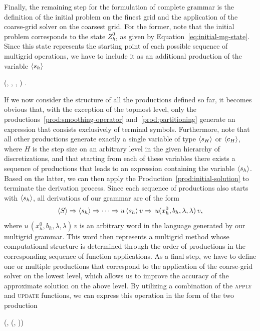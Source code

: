 Finally, the remaining step for the formulation of complete grammar is the definition of the initial problem on the finest grid and the application of the coarse-grid solver on the coarsest grid.
For the former, note that the initial problem corresponds to the state $Z_h^0$, as given by Equation~\eqref{eq:initial-mg-state}.
Since this state represents the starting point of each possible sequence of multigrid operations, we have to include it as an additional production of the variable $\langle s_h \rangle$
\begin{production}
	 {
	 (, , \bnfes, \bnfes)
	}.
\label{prod:initial-solution}
\end{production} 
If we now consider the structure of all the productions defined so far, it becomes obvious that, with the exception of the topmost level, only the productions~\eqref{prod:smoothing-operator} and~\eqref{prod:partitioning} generate an expression that consists exclusively of terminal symbols.
Furthermore, note that all other productions generate exactly a single variable of type $\langle s_H \rangle$ or $\langle c_H \rangle$, where $H$ is the step size on an arbitrary level in the given hierarchy of discretizations, and that starting from each of these variables there exists a sequence of productions that leads to an expression containing the variable $\langle s_h \rangle$.
Based on the latter, we can then apply the Production~\eqref{prod:initial-solution} to terminate the derivation process.
Since each sequence of productions also starts with $\langle s_h \rangle$, all derivations of our grammar are of the form
\begin{equation*}
	\langle S \rangle \Rightarrow \langle s_h \rangle \Rightarrow \dots \Rightarrow u \, \langle s_h \rangle \, v \Rightarrow \, u (x_h^0, b_h, \lambda, \lambda) \, v,
\end{equation*}
where $u  \, (x_h^0, b_h, \lambda, \lambda) \, v$ is an arbitrary word in the language generated by our multigrid grammar.
This word then represents a multigrid method whose computational structure is determined through the order of productions in the corresponding sequence of function applications.
As a final step, we have to define one or multiple productions that correspond to the application of the coarse-grid solver on the lowest level, which allows us to improve the accuracy of the approximate solution on the above level.
By utilizing a combination of the \textsc{apply} and \textsc{update} functions, we can express this operation in the form of the two production
\begin{production}
	 {
		(, \bnfsp {}(, \bnfsp{}))
  \label{prod:coarse-grid-solver}
	}  \\
\end{production}
